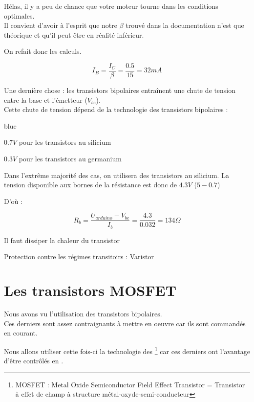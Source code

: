     Hélas, il y a peu de chance que votre moteur tourne dans les conditions optimales.\\
    Il convient d'avoir à l'esprit que notre $\beta$ trouvé dans la documentation n'est que théorique et qu'il peut être en réalité inférieur.

    
    On refait donc les calculs.

    $$  I_{B} = \frac{I_{C}}{\beta} = \frac{0.5}{15} = 32 mA $$

    Une dernière chose : les transistors bipolaires entraînent une chute de tension entre la base et l'émetteur ($V_{be}$).\\
    Cette chute de tension dépend de la technologie des transistors bipolaires : 

    \begin{items}{blue}{\Triangle}

      \item $0.7V$ pour les transistors au silicium
      \item $0.3V$ pour les transistors au germanium
    \end{items}
    Dans l'extrême majorité des cas, on utilisera des transistors au silicium. La tension disponible aux bornes de la résistance est donc de $4.3V$ ($5-0.7$)

    D'où : 

    $$ \boxed{ R_{b} = \frac{U_{arduino}-V_{be}}{I_b} = \frac{4.3}{0.032} = 134 \Omega} $$


Il faut dissiper la chaleur du transistor


Protection contre les régimes transitoirs : Varistor 



\section{Les transistors MOSFET}

     Nous avons vu l'utilisation des transistors bipolaires. \\
     Ces derniers sont assez contraignants à mettre en oeuvre car ils sont commandés en courant.

     Nous allons utiliser cette fois-ci la technologie des  \footnote{MOSFET : Metal Oxide Semiconductor Field Effect Transistor = Transistor à effet de champ à structure métal-oxyde-semi-conducteur} car ces derniers ont l'avantage d'être contrôlés en .

